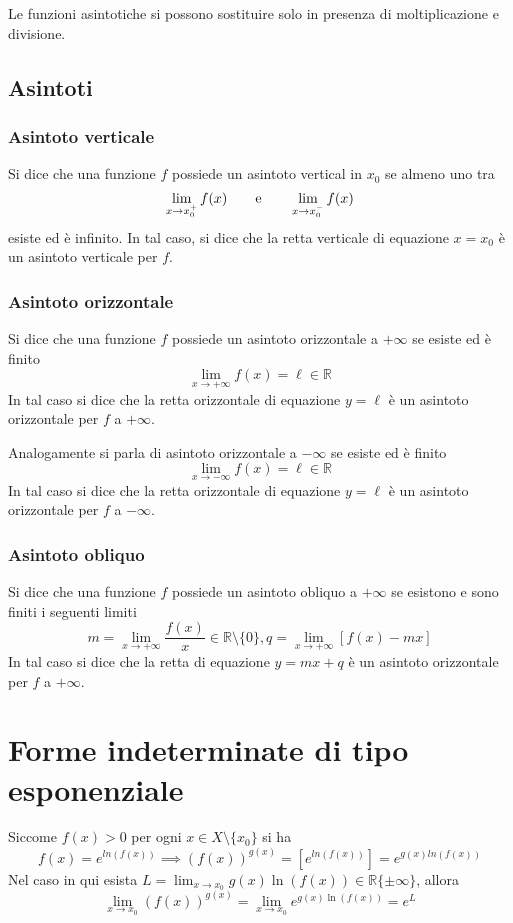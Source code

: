 \documentclass[11pt]{book}
\begin{document}
Le funzioni asintotiche si possono sostituire solo in presenza di moltiplicazione e divisione.
\subsection{Asintoti}
\subsubsection*{Asintoto verticale}
Si dice che una funzione $f$ possiede un asintoto vertical in $x_0$ se almeno uno tra 
\begin{equation*}
    \lim_{x\rightarrow x_0^+}f(x)\qquad\textnormal{e}\qquad\lim_{x\rightarrow x_0^-}f(x)
\end{equation*}
esiste ed è infinito. In tal caso, si dice che la retta verticale di equazione $x=x_0$ è un asintoto verticale per $f$.
\subsubsection*{Asintoto orizzontale}
Si dice che una funzione $f$ possiede un asintoto orizzontale a $+\infty$ se esiste ed è finito
\begin{equation*}
    \lim_{x\rightarrow +\infty}f(x)=\ell\in\mathbb{R}
\end{equation*}
In tal caso si dice che la retta orizzontale di equazione $y=\ell$ è un asintoto orizzontale per $f$ a $+\infty$.

Analogamente si parla di asintoto orizzontale a $-\infty$ se esiste ed è finito
\begin{equation*}
    \lim_{x\rightarrow -\infty}f(x)=\ell\in\mathbb{R}
\end{equation*}
In tal caso si dice che la retta orizzontale di equazione $y=\ell$ è un asintoto orizzontale per $f$ a $-\infty$.
\subsubsection*{Asintoto obliquo}
Si dice che una funzione $f$ possiede un asintoto obliquo a $+\infty$ se esistono e sono finiti i seguenti limiti
\begin{equation*}
    m=\lim_{x\rightarrow +\infty}\frac{f(x)}{x}\in\mathbb{R}\setminus\{0\}, q=\lim_{x\rightarrow +\infty}[f(x)-mx]
\end{equation*}
In tal caso si dice che la retta di equazione $y=mx+q$ è un asintoto orizzontale per $f$ a $+\infty$.
\section{Forme indeterminate di tipo esponenziale}
Siccome $f(x)>0$ per ogni $x\in X\setminus\{x_0\}$ si ha 
\begin{equation*}
    f(x)=e^{ln(f(x))}\implies(f(x))^{g(x)}=[e^{ln(f(x))}]=e^{g(x)ln(f(x))}
\end{equation*}
Nel caso in qui esista $L=\lim_{x\rightarrow x_0}g(x)\ln(f(x))\in\mathbb{R}\{\pm\infty\}$, allora
\begin{equation*}
    \lim_{x\rightarrow x_0}(f(x))^{g(x)}=\lim_{x\rightarrow x_0}e^{g(x)\ln(f(x))}=e^L
\end{equation*}
\end{document}
